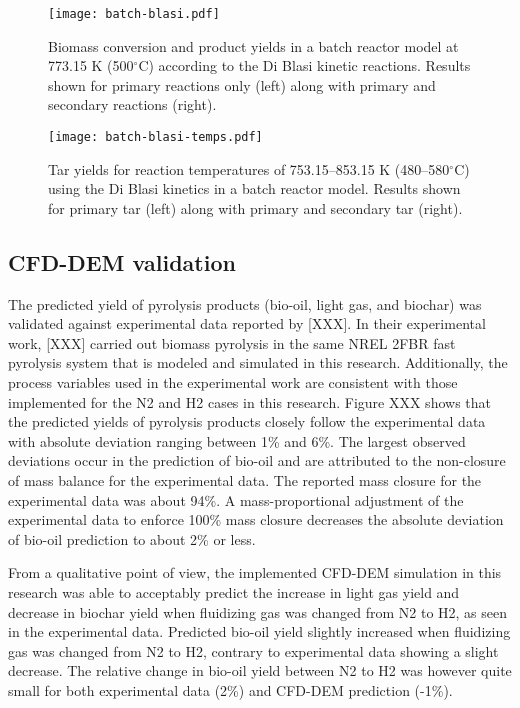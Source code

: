 \begin{figure}[H]
    \centering
    \texttt{[image: batch-blasi.pdf]}
    \caption{Biomass conversion and product yields in a batch reactor model at 773.15 K (500$^\circ$C) according to the Di Blasi kinetic reactions. Results shown for primary reactions only (left) along with primary and secondary reactions (right).}
    \label{fig:batch-blasi}
\end{figure}

\begin{figure}[H]
    \centering
    \texttt{[image: batch-blasi-temps.pdf]}
    \caption{Tar yields for reaction temperatures of 753.15--853.15 K (480--580$^\circ$C) using the Di Blasi kinetics in a batch reactor model. Results shown for primary tar (left) along with primary and secondary tar (right).}
    \label{fig:batch-blasi-temps}
\end{figure}

\subsection{CFD-DEM validation}

The predicted yield of pyrolysis products (bio-oil, light gas, and biochar) was validated against experimental data reported by [XXX]. In their experimental work, [XXX] carried out biomass pyrolysis in the same NREL 2FBR fast pyrolysis system that is modeled and simulated in this research. Additionally, the process variables used in the experimental work are consistent with those implemented for the N2 and H2 cases in this research. Figure XXX shows that the predicted yields of pyrolysis products closely follow the experimental data with absolute deviation ranging between 1\% and 6\%. The largest observed deviations occur in the prediction of bio-oil and are attributed to the non-closure of mass balance for the experimental data. The reported mass closure for the experimental data was about 94\%. A mass-proportional adjustment of the experimental data to enforce 100\% mass closure decreases the absolute deviation of bio-oil prediction to about 2\% or less.

From a qualitative point of view, the implemented CFD-DEM simulation in this research was able to acceptably predict the increase in light gas yield and decrease in biochar yield when fluidizing gas was changed from N2 to H2, as seen in the experimental data. Predicted bio-oil yield slightly increased when fluidizing gas was changed from N2 to H2, contrary to experimental data showing a slight decrease. The relative change in bio-oil yield between N2 to H2 was however quite small for both experimental data (2\%) and CFD-DEM prediction (-1\%).

